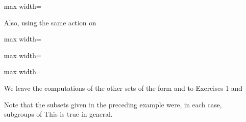 \documentclass[11pt,oneside]{article}
\begin{document}
\begin{BookBody}
\begin{center}\begin{adjustbox}{max width=\linewidth}\end{adjustbox}\end{center}

Also, using the same  action on 

\begin{center}\begin{adjustbox}{max width=\linewidth}\end{adjustbox}\end{center}

\begin{center}\begin{adjustbox}{max width=\linewidth}\end{adjustbox}\end{center}

\begin{center}\begin{adjustbox}{max width=\linewidth}\end{adjustbox}\end{center}

We leave the computations of the other sets of the form  and  to Exercises 1 and \BookEnd{\blacktriangle}

Note that the subsets  given in the preceding example were, in each case, subgroups of  This is true in general.

\end{BookBody}

\BookNarrativetrue
\end{document}
